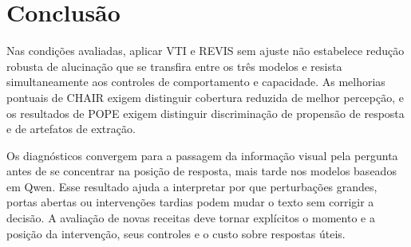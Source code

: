 \section{Conclusão}
Nas condições avaliadas, aplicar VTI e REVIS sem ajuste não estabelece redução robusta de alucinação que se transfira entre os três modelos e resista simultaneamente aos controles de comportamento e capacidade. As melhorias pontuais de CHAIR exigem distinguir cobertura reduzida de melhor percepção, e os resultados de POPE exigem distinguir discriminação de propensão de resposta e de artefatos de extração.

Os diagnósticos convergem para a passagem da informação visual pela pergunta antes de se concentrar na posição de resposta, mais tarde nos modelos baseados em Qwen. Esse resultado ajuda a interpretar por que perturbações grandes, portas abertas ou intervenções tardias podem mudar o texto sem corrigir a decisão. A avaliação de novas receitas deve tornar explícitos o momento e a posição da intervenção, seus controles e o custo sobre respostas úteis.
